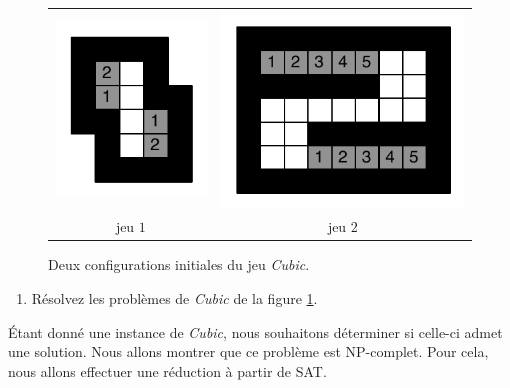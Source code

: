 \documentclass[12pt]{article}
\begin{document}
\begin{figure}[h]
\begin{center}
  \begin{tabular}{c c}
    \includegraphics[scale=0.65]{./figures/exemple1} &
    \includegraphics[scale=0.65]{./figures/exemple2}\\
 jeu $1$ &
 jeu $2$
 \end{tabular}
\end{center}
 \caption{Deux configurations initiales du jeu \textit{Cubic}.}
 \label{exemples}
\end{figure}

\begin{enumerate}
	\item Résolvez les problèmes de \textit{Cubic} de la figure \ref{exemples}.
\end{enumerate}

Étant donné une instance de \textit{Cubic}, nous souhaitons déterminer si celle-ci admet une solution. Nous allons montrer que ce problème est NP-complet. Pour cela, nous allons effectuer une réduction à partir de SAT.
\end{document}
